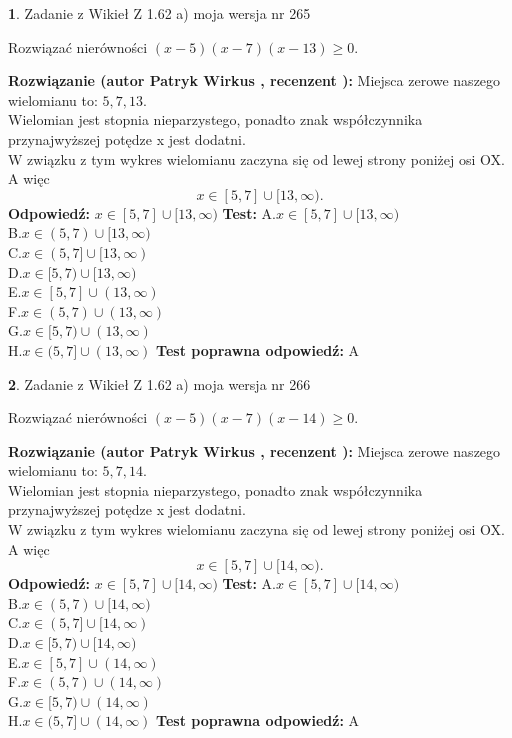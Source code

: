 \documentclass[12pt, a4paper]{article}
\theoremstyle{definition} %
\newtheorem{zad}{}
\newcommand{\zadStart}[1]{\begin{zad}#1\newline}
\newcommand{\zadStop}{\end{zad}}
\newcommand{\rozwStart}[2]{\noindent \textbf{Rozwiązanie (autor #1 , recenzent #2): }\newline}
\newcommand{\rozwStop}{\newline}
\newcommand{\odpStart}{\noindent \textbf{Odpowiedź:}\newline}
\newcommand{\odpStop}{\newline}
\newcommand{\testStart}{\noindent \textbf{Test:}\newline}
\newcommand{\testStop}{\newline}
\newcommand{\kluczStart}{\noindent \textbf{Test poprawna odpowiedź:}\newline}
\newcommand{\kluczStop}{\newline}
\begin{document}
\zadStart{Zadanie z Wikieł Z 1.62 a) moja wersja nr 265}

Rozwiązać nierówności $(x-5)(x-7)(x-13)\ge0$.
\zadStop
\rozwStart{Patryk Wirkus}{}
Miejsca zerowe naszego wielomianu to: $5, 7, 13$.\\
Wielomian jest stopnia nieparzystego, ponadto znak współczynnika przy\linebreak najwyższej potędze x jest dodatni.\\ W związku z tym wykres wielomianu zaczyna się od lewej strony poniżej osi OX. A więc $$x \in [5,7] \cup [13,\infty).$$
\rozwStop
\odpStart
$x \in [5,7] \cup [13,\infty)$
\odpStop
\testStart
A.$x \in [5,7] \cup [13,\infty)$\\
B.$x \in (5,7) \cup [13,\infty)$\\
C.$x \in (5,7] \cup [13,\infty)$\\
D.$x \in [5,7) \cup [13,\infty)$\\
E.$x \in [5,7] \cup (13,\infty)$\\
F.$x \in (5,7) \cup (13,\infty)$\\
G.$x \in [5,7) \cup (13,\infty)$\\
H.$x \in (5,7] \cup (13,\infty)$
\testStop
\kluczStart
A
\kluczStop



\zadStart{Zadanie z Wikieł Z 1.62 a) moja wersja nr 266}

Rozwiązać nierówności $(x-5)(x-7)(x-14)\ge0$.
\zadStop
\rozwStart{Patryk Wirkus}{}
Miejsca zerowe naszego wielomianu to: $5, 7, 14$.\\
Wielomian jest stopnia nieparzystego, ponadto znak współczynnika przy\linebreak najwyższej potędze x jest dodatni.\\ W związku z tym wykres wielomianu zaczyna się od lewej strony poniżej osi OX. A więc $$x \in [5,7] \cup [14,\infty).$$
\rozwStop
\odpStart
$x \in [5,7] \cup [14,\infty)$
\odpStop
\testStart
A.$x \in [5,7] \cup [14,\infty)$\\
B.$x \in (5,7) \cup [14,\infty)$\\
C.$x \in (5,7] \cup [14,\infty)$\\
D.$x \in [5,7) \cup [14,\infty)$\\
E.$x \in [5,7] \cup (14,\infty)$\\
F.$x \in (5,7) \cup (14,\infty)$\\
G.$x \in [5,7) \cup (14,\infty)$\\
H.$x \in (5,7] \cup (14,\infty)$
\testStop
\kluczStart
A
\kluczStop
\end{document}
